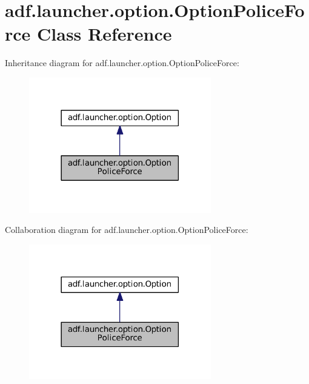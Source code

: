 \hypertarget{classadf_1_1launcher_1_1option_1_1OptionPoliceForce}{}\section{adf.\+launcher.\+option.\+Option\+Police\+Force Class Reference}
\label{classadf_1_1launcher_1_1option_1_1OptionPoliceForce}


Inheritance diagram for adf.\+launcher.\+option.\+Option\+Police\+Force\+:
\nopagebreak
\begin{figure}[H]
\begin{center}
\leavevmode
\includegraphics[width=225pt]{classadf_1_1launcher_1_1option_1_1OptionPoliceForce__inherit__graph}
\end{center}
\end{figure}


Collaboration diagram for adf.\+launcher.\+option.\+Option\+Police\+Force\+:
\nopagebreak
\begin{figure}[H]
\begin{center}
\leavevmode
\includegraphics[width=225pt]{classadf_1_1launcher_1_1option_1_1OptionPoliceForce__coll__graph}
\end{center}
\end{figure}

